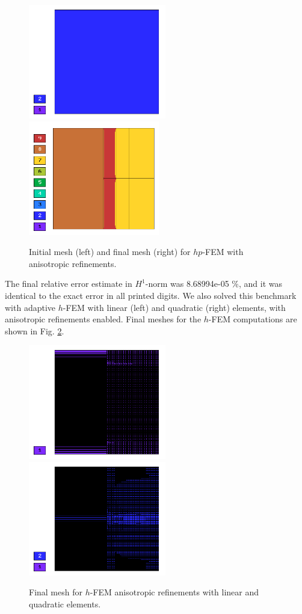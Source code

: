 \begin{figure}[!ht]
\centering
\includegraphics[height=5cm]{nist/nist-10/mesh_hp_aniso_init.png}\ \
\includegraphics[height=5cm]{nist/nist-10/mesh_hp_aniso.png}
\caption{Initial mesh (left) and final mesh (right) for $hp$-FEM with anisotropic refinements.}
\label{fig:nist-10-hp-aniso}
\end{figure}

The final relative error estimate in $H^1$-norm was 8.68994e-05 \%,
and it was identical to the exact error in all printed digits.
We also solved this benchmark with adaptive $h$-FEM
with linear (left) and quadratic (right)
elements, with anisotropic refinements enabled.
Final meshes for the $h$-FEM computations are shown
in Fig. \ref{fig:nist-10-h-aniso}.

\begin{figure}[!ht]
\centering
\includegraphics[height=5cm]{nist/nist-10/mesh_h1_aniso.png}\ \
\includegraphics[height=5cm]{nist/nist-10/mesh_h2_aniso.png}
\caption{Final mesh for $h$-FEM anisotropic refinements with linear and quadratic elements.}
\label{fig:nist-10-h-aniso}
\end{figure}


